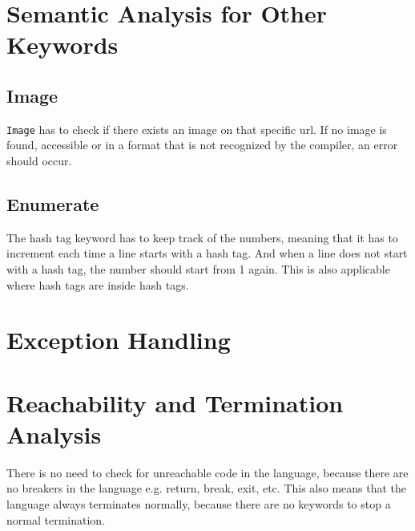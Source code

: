 \section{Semantic Analysis for Other Keywords}
     \subsection{Image}
\texttt{Image} has to check if there exists an image on that specific url. If no image is found, accessible or in a format that is not recognized by the compiler, an error should occur.


     \subsection{Enumerate}
The hash tag keyword has to keep track of the numbers, meaning that it has to increment each time a line starts with a hash tag. And when a line does not start with a hash tag, the number should start from 1 again. This is also applicable where hash tags are inside hash tags.

\section{Exception Handling}




\section{Reachability and Termination Analysis}
There is no need to check for unreachable code in the language, because there are no breakers in the language e.g. return, break, exit, etc.
This also means that the language always terminates normally, because there are no keywords to stop a normal termination.

